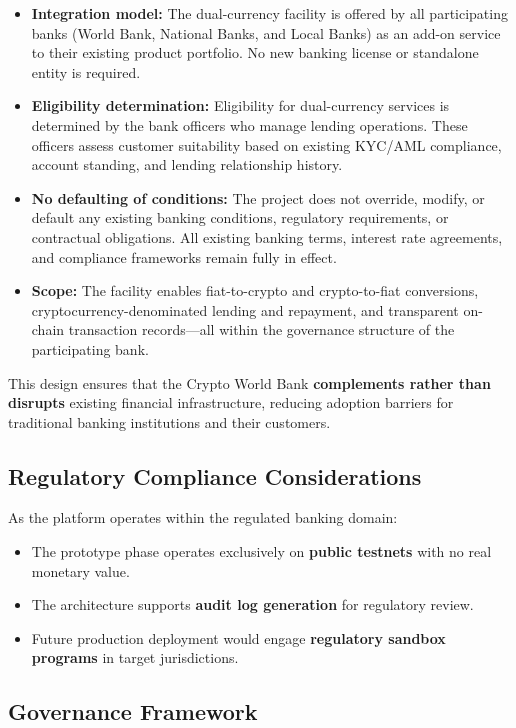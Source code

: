 \documentclass[11pt,a4paper]{article}
\begin{document}
\begin{itemize}[noitemsep]
\item \textbf{Integration model:} The dual-currency facility is offered by all participating banks (World Bank, National Banks, and Local Banks) as an add-on service to their existing product portfolio. No new banking license or standalone entity is required.
\item \textbf{Eligibility determination:} Eligibility for dual-currency services is determined by the bank officers who manage lending operations. These officers assess customer suitability based on existing KYC/AML compliance, account standing, and lending relationship history.
\item \textbf{No defaulting of conditions:} The project does not override, modify, or default any existing banking conditions, regulatory requirements, or contractual obligations. All existing banking terms, interest rate agreements, and compliance frameworks remain fully in effect.
\item \textbf{Scope:} The facility enables fiat-to-crypto and crypto-to-fiat conversions, cryptocurrency-denominated lending and repayment, and transparent on-chain transaction records---all within the governance structure of the participating bank.
\end{itemize}

This design ensures that the Crypto World Bank \textbf{complements rather than disrupts} existing financial infrastructure, reducing adoption barriers for traditional banking institutions and their customers.

\subsection{Regulatory Compliance Considerations}

As the platform operates within the regulated banking domain:
\begin{itemize}[noitemsep]
\item The prototype phase operates exclusively on \textbf{public testnets} with no real monetary value.
\item The architecture supports \textbf{audit log generation} for regulatory review.
\item Future production deployment would engage \textbf{regulatory sandbox programs} in target jurisdictions.
\end{itemize}

\subsection{Governance Framework}
\end{document}

